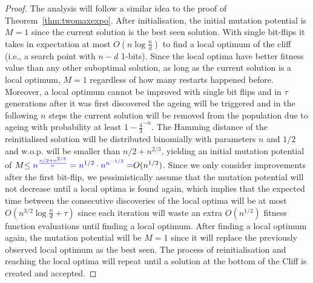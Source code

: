 \documentclass[lettersize,journal]{IEEEtran}
\begin{document}
\begin{proof}
The analysis will follow a similar idea to the proof of 
Theorem~\ref{thm:twomaxexpo}. After initialisation, the initial mutation 
potential is $M=1$ since the current solution is the best seen solution. With 
single bit-flips it takes in expectation at most {\color{blue}$O(n \log{\frac{n}{d}})$} to find 
a local optimum of the cliff (i.e., a search point with $n-d$ 1-bits). Since the 
local optima {\color{blue} have better fitness value than any other suboptimal solution, as long as the current solution is a local optimum, $M=1$ regardless of how many restarts happened before. Moreover,} a local optimum cannot be improved with single bit flips and in $\tau$ generations after it was first discovered the ageing will be triggered and in the following 
$n$ steps the current solution will be removed from the population due to 
ageing with probability at least {\color{blue} $1-\frac{4}{3}^{-n}$}. The Hamming distance of the  
reinitialised solution will be distributed binomially with parameters $n$ and 
$1/2$ and w.o.p. will be smaller than $n/2 + 
n^{2/3}$, yielding an initial mutation potential of $M{\color{blue}\leq n^{\frac{n/2+n^{2/3}}{n}}=n^{1/2}\cdot n^{n^{-1/3}}=} O(n^{1/2})$. {\color{blue}Since we only consider improvements after the first bit-flip,} we 
pessimistically assume that the mutation potential will not decrease until a  
local optima is found again, which implies that the expected time {\color{blue} between the consecutive discoveries of the local optima} will be at 
most {\color{blue}$O(n^{3/2}\log{\frac{n}{d}}+\tau)$ } since each iteration will waste an extra 
$O(n^{1/2})$ fitness function evaluations {\color{blue} until finding a local optimum}. After finding a local optimum 
again, the mutation potential will be $M=1$ since it will replace the 
previously observed local optimum as the best seen. The process of 
reinitialisation and reaching the local optima will repeat until a solution at the bottom of the Cliff is created and accepted.


\end{proof}
\end{document}
